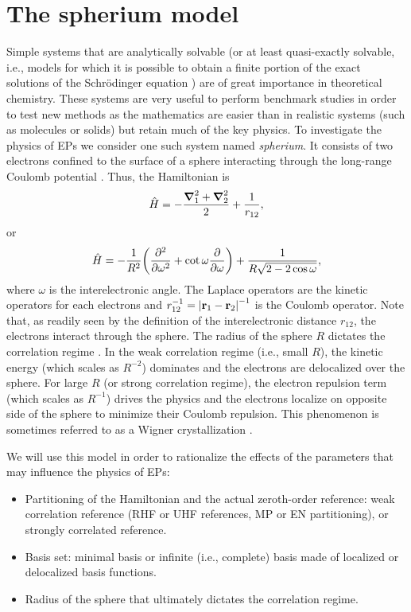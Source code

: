 \documentclass[11pt,a4paper]{article}
\newcommand{\hH}{\Hat{H}}
\begin{document}
\section{The spherium model}\label{sec:spherium}

Simple systems that are analytically solvable (or at least quasi-exactly solvable, i.e., models for which it is possible to obtain a finite portion of the exact solutions of the Schr{\"o}dinger equation \cite{Ushveridze_1994}) are of great importance in theoretical chemistry. 
These systems are very useful to perform benchmark studies in order to test new methods as the mathematics are easier than in realistic systems (such as molecules or solids) but retain much of the key physics. 
To investigate the physics of EPs we consider one such system named \textit{spherium}. 
It consists of two electrons confined to the surface of a sphere interacting through the long-range Coulomb potential \cite{Thompson_2005, Seidl_2007, Loos_2009b}. 
Thus, the Hamiltonian is
\begin{equation}
	\hH = -\frac{\grad_1^2 + \grad_2^2}{2} + \frac{1}{r_{12}},
\end{equation}
or
\begin{equation}
	\hH = -\frac{1}{R^2} \qty( \pdv[2]{}{\omega} + \cot \omega \pdv{}{\omega}) + \frac{1}{R \sqrt{2 - 2 \cos \omega}},
\end{equation}
where $\omega$ is the interelectronic angle.
The Laplace operators are the kinetic operators for each electrons and $r_{12}^{-1} = \abs{\vb{r}_1 - \vb{r}_2}^{-1}$ is the Coulomb operator. 
Note that, as readily seen by the definition of the interelectronic distance $r_{12}$, the electrons interact through the sphere.
The radius of the sphere $R$ dictates the correlation regime \cite{Loos_2009}. 
In the weak correlation regime (i.e., small $R$), the kinetic energy (which scales as $R^{-2}$) dominates and the electrons are delocalized over the sphere.
For large $R$ (or strong correlation regime), the electron repulsion term (which scales as $R^{-1}$) drives the physics and the electrons localize on opposite side of the sphere to minimize their Coulomb repulsion. 
This phenomenon is sometimes referred to as a Wigner crystallization \cite{Wigner_1934}.

We will use this model in order to rationalize the effects of the parameters that may influence the physics of EPs:
\begin{itemize}
	\item Partitioning of the Hamiltonian and the actual zeroth-order reference: weak correlation reference (RHF or UHF references, MP or EN partitioning), or strongly correlated reference.
	\item Basis set: minimal basis or infinite (i.e., complete) basis made of localized or delocalized basis functions.
	\item Radius of the sphere that ultimately dictates the correlation regime.
\end{itemize}
\end{document}
